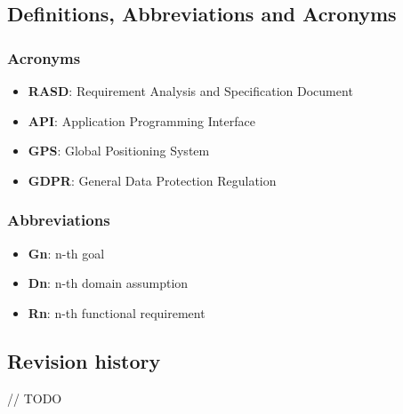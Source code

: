 \subsection{Definitions, Abbreviations and Acronyms}
\subsubsection{Acronyms}
\begin{itemize}
	\item \textbf{RASD}: Requirement Analysis and Specification Document
	\item \textbf{API}: Application Programming Interface
	\item \textbf{GPS}: Global Positioning System
	\item \textbf{GDPR}: General Data Protection Regulation
\end{itemize}

\subsubsection{Abbreviations}
\begin{itemize}
	\item \textbf{Gn}: n-th goal
	\item \textbf{Dn}: n-th domain assumption
	\item \textbf{Rn}: n-th functional requirement
\end{itemize}


\subsection{Revision history}
 // TODO
 
